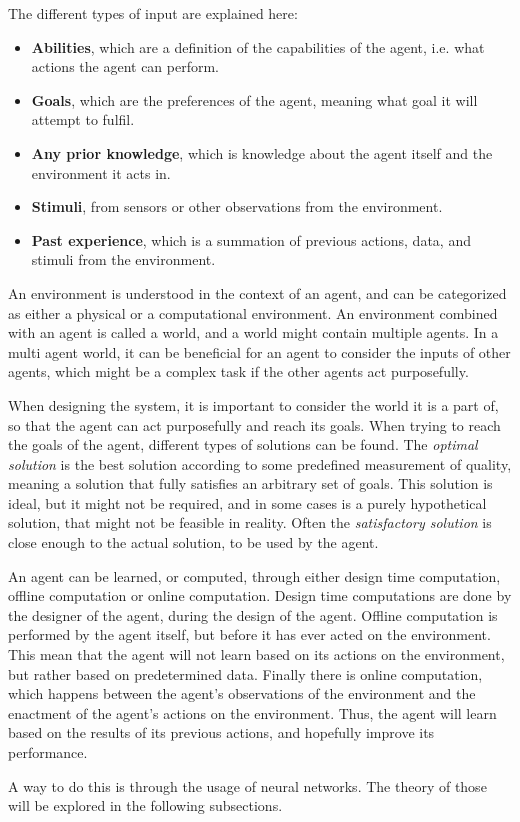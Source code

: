 The different types of input are explained here:
\begin{itemize}
    \item \textbf{Abilities}, which are a definition of the capabilities of the agent, i{.}e{.} what actions the agent can perform.
    \item \textbf{Goals}, which are the preferences of the agent, meaning what goal it will attempt to fulfil.
    \item \textbf{Any prior knowledge}, which is knowledge about the agent itself and the environment it acts in.
    \item \textbf{Stimuli}, from sensors or other observations from the environment.
    \item \textbf{Past experience}, which is a summation of previous actions, data, and stimuli from the environment.
\end{itemize}


An environment is understood in the context of an agent, and can be categorized as either a physical or a computational environment.
An environment combined with an agent is called a world, and a world might contain multiple agents.
In a multi agent world, it can be beneficial for an agent to consider the inputs of other agents, which might be a complex task if the other agents act purposefully.

When designing the system, it is important to consider the world it is a part of, so that the agent can act purposefully and reach its goals.
When trying to reach the goals of the agent, different types of solutions can be found.
The \textit{optimal solution} is the best solution according to some predefined measurement of quality, meaning a solution that fully satisfies an arbitrary set of goals.
This solution is ideal, but it might not be required, and in some cases is a purely hypothetical solution, that might not be feasible in reality.
Often the \textit{satisfactory solution} is close enough to the actual solution, to be used by the agent.


An agent can be learned, or computed, through either design time computation, offline computation or online computation.
Design time computations are done by the designer of the agent, during the design of the agent.
Offline computation is performed by the agent itself, but before it has ever acted on the environment.
This mean that the agent will not learn based on its actions on the environment, but rather based on predetermined data.
Finally there is online computation, which happens between the agent's observations of the environment and the enactment of the agent's actions on the environment.
Thus, the agent will learn based on the results of its previous actions, and hopefully improve its performance.

A way to do this is through the usage of neural networks.
The theory of those will be explored in the following subsections.

